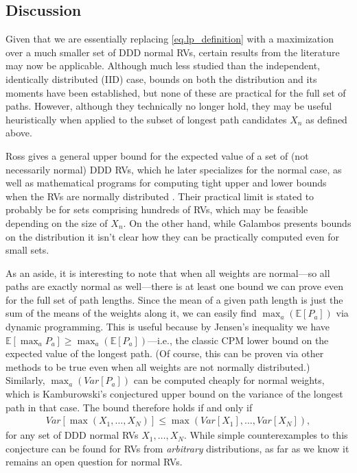 \documentclass[12pt]{article}
\def\E{\mathbb{E}}
\begin{document}
\subsection{Discussion}
\label{subsect.discussion}

Given that we are essentially replacing \eqref{eq.lp_definition} with a maximization over a much smaller set of DDD normal RVs, certain results from the literature may now be applicable. Although much less studied than the independent, identically distributed (IID) case, bounds on both the distribution and its moments have been established, but none of these are practical for the full set of paths. However, although they technically no longer hold, they may be useful heuristically when applied to the subset of longest path candidates $X_n$ as defined above.

Ross gives a general upper bound for the expected value of a set of (not necessarily normal) DDD RVs, which he later specializes for the normal case, as well as mathematical programs for computing tight upper and lower bounds when the RVs are normally distributed \cite{ross03}. Their practical limit is stated to probably be for sets comprising hundreds of RVs, which may be feasible depending on the size of $X_n$. On the other hand, while Galambos \cite{gal72} presents bounds on the distribution it isn't clear how they can be practically computed even for small sets.

As an aside, it is interesting to note that when all weights are normal---so all paths are exactly normal as well---there is at least one bound we can prove even for the full set of path lengths. Since the mean of a given path length is just the sum of the means of the weights along it, we can easily find $\max_a(\E[P_a])$ via dynamic programming. This is useful because by Jensen's inequality we have  
  $\E[\max_aP_a] \geq \max_a(\E[P_a])$---i.e., the classic CPM lower bound on the expected value of the longest path. (Of course, this can be proven via other methods to be true even when all weights are not normally distributed.) Similarly, $\max_a(Var[P_a])$ can be computed cheaply for normal weights, which is Kamburowski's conjectured upper bound on the variance of the longest path in that case. The bound therefore holds if and only if
  \begin{align*}
    Var[\max(X_1, \dots, X_N)] \leq \max(Var[X_1], \dots, Var[X_N]),
  \end{align*}
  for any set of DDD normal RVs $X_1, \dots, X_N$. While simple counterexamples to this conjecture can be found for RVs from {\em arbitrary} distributions, as far as we know it remains an open question for normal RVs.
\end{document}
